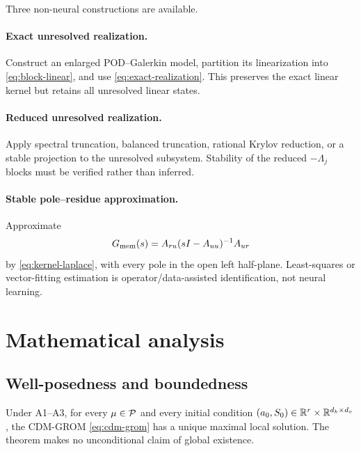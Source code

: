 Three non-neural constructions are available.

\paragraph{Exact unresolved realization.}
Construct an enlarged POD--Galerkin model, partition its linearization into
\eqref{eq:block-linear}, and use \eqref{eq:exact-realization}. This preserves
the exact linear kernel but retains all unresolved linear states.

\paragraph{Reduced unresolved realization.}
Apply spectral truncation, balanced truncation, rational Krylov reduction, or
a stable projection to the unresolved subsystem. Stability of the reduced
$-\Lambda_j$ blocks must be verified rather than inferred.

\paragraph{Stable pole--residue approximation.}
Approximate
\begin{equation}
 G_{\mathrm{mem}}(s)=A_{ru}(sI-A_{uu})^{-1}A_{ur}
 \label{eq:memory-transfer}
\end{equation}
by \eqref{eq:kernel-laplace}, with every pole in the open left half-plane.
Least-squares or vector-fitting estimation is operator/data-assisted
identification, not neural learning.

\section{Mathematical analysis}
\label{sec:analysis}

\subsection{Well-posedness and boundedness}
\label{sec:wellposedness}

\label{thm:local-wellposedness}
\begin{theoremtwo}
Under A1--A3, for every $\mu\in\mathcal{P}$ and every initial condition
$(a_0,S_0)\in\mathbb{R}^r\times\mathbb{R}^{d_k\times d_v}$, the CDM-GROM
\eqref{eq:cdm-grom} has a unique maximal local solution. The theorem makes no
unconditional claim of global existence.
\end{theoremtwo}

